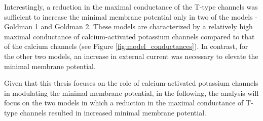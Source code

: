 \documentclass[../main.tex]{subfiles}
\begin{document}
Interestingly, a reduction in the maximal conductance of the T-type channels was sufficient to increase the minimal membrane potential only in two of the models - Goldman 1 and Goldman 2. These models are characterized by a relatively high maximal conductance of calcium-activated potassium channels compared to that of the calcium channels (see Figure \ref{fig:model_conductances}).
In contrast, for the other two models, an increase in external current was necessary to elevate the minimal membrane potential.

Given that this thesis focuses on the role of calcium-activated potassium channels in modulating the minimal membrane potential, in the following, the analysis will focus on the two models in which a reduction in the maximal conductance of T-type channels resulted in increased minimal membrane potential.
\end{document}
